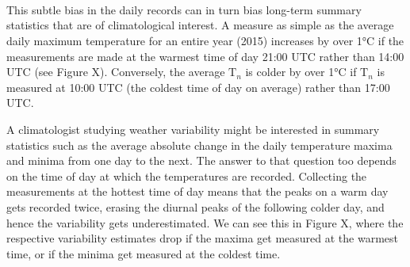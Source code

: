 \documentclass[letter]{article}
\newcommand{\Tn}{\mathrm{T}_{n}}
\begin{document}
    			
    \begin{figure}[tbh]
    \begin{center}
    \end{center}
    { \hspace*{\fill} \\}
	\end{figure}
    
    		

    			
    \begin{figure}[tbh]
    \begin{center}
    \end{center}
    { \hspace*{\fill} \\}
	\end{figure}
    
    		

    			
    \begin{figure}[tbh]
    \begin{center}
    \end{center}
    { \hspace*{\fill} \\}
	\end{figure}
    
    		
    	This subtle bias in the daily records can in turn bias long-term summary
statistics that are of climatological interest. A measure as simple as
the average daily maximum temperature for an entire year (2015)
increases by over 1°C if the measurements are made at the warmest time
of day 21:00 UTC rather than 14:00 UTC (see Figure X). Conversely, the
average \(\Tn\) is colder by over 1°C if \(\Tn\) is measured at 10:00
UTC (the coldest time of day on average) rather than 17:00 UTC.

A climatologist studying weather variability might be interested in
summary statistics such as the average absolute change in the daily
temperature maxima and minima from one day to the next. The answer to
that question too depends on the time of day at which the temperatures
are recorded. Collecting the measurements at the hottest time of day
means that the peaks on a warm day gets recorded twice, erasing the
diurnal peaks of the following colder day, and hence the variability
gets underestimated. We can see this in Figure X, where the respective
variability estimates drop if the maxima get measured at the warmest
time, or if the minima get measured at the coldest time.
    
\end{document}
